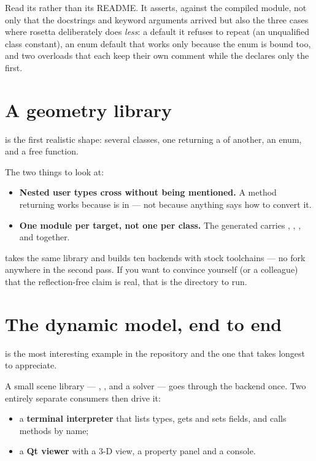 Read its  rather than its README. It asserts, against the
compiled module, not only that the docstrings and keyword arguments arrived but
also the three cases where rosetta deliberately does \emph{less}: a default it
refuses to repeat (an unqualified class constant), an enum default that works
only because the enum is bound too, and two  overloads that each
keep their own comment while the  declares only the first.

\section{A geometry library}

 is the first realistic shape: several classes, one
returning a  of another, an enum, and a free function.

The two things to look at:

\begin{itemize}
  \item \textbf{Nested user types cross without being mentioned.} A
     method returning  works because
     is in  --- not because anything says how to
    convert it.
  \item \textbf{One module per target, not one per class.} The generated
     carries , , ,
     and  together.
\end{itemize}

 takes the same library and builds ten backends
with stock toolchains --- no fork anywhere in the second pass. If you want to
convince yourself (or a colleague) that the reflection-free claim is real, that
is the directory to run.

\section{The dynamic model, end to end}

 is the most interesting example in the repository and
the one that takes longest to appreciate.

A small scene library --- , , and a  solver
--- goes through the  backend once. Two entirely separate
consumers then drive it:

\begin{itemize}
  \item a \textbf{terminal interpreter} that lists types, gets and sets fields,
    and calls methods by name;
  \item a \textbf{Qt viewer} with a 3-D view, a property panel and a console.
\end{itemize}

